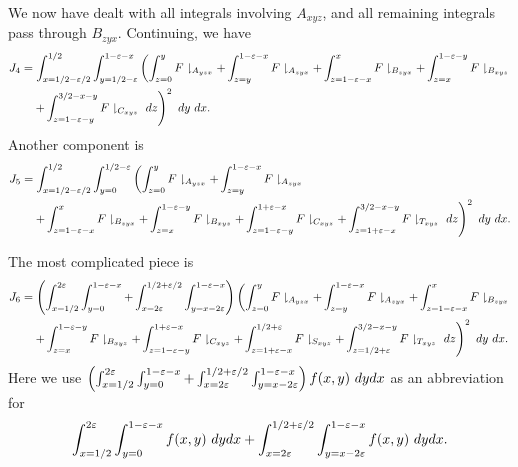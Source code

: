 We now have dealt with all integrals involving $A_{xyz}$, and all remaining integrals pass through $B_{zyx}$.  Continuing, we have
\begin{align*}
J_4 & =\int_{x=1/2-\varepsilon/2}^{1/2}\int_{y=1/2-\varepsilon}^{1-\varepsilon-x} \left(\int_{z=0}^{y}F\downharpoonright_{A_{yzx}}+\int_{z=y}^{1-\varepsilon-x}F\downharpoonright_{A_{zyx}} +\int_{z=1-\varepsilon-x}^{x}F\downharpoonright_{B_{zyx}} +\int_{z=x}^{1-\varepsilon-y}F\downharpoonright_{B_{xyz}}\right. \\
&\quad \left. +\int_{z=1-\varepsilon-y}^{3/2-x-y}F\downharpoonright_{C_{xyz}}\ dz \right)^{2}\ dy\ dx.
\end{align*}
Another component is
\begin{align*}
J_5 & = \int_{x=1/2-\eps/2}^{1/2}\int_{y=0}^{1/2-\eps} \left(\int_{z=0}^{y}F\downharpoonright_{A_{yzx}}+\int_{z=y}^{1-\eps-x}F\downharpoonright_{A_{zyx}} \right. \\
&\quad \left. +\int_{z=1-\eps-x}^{x}F\downharpoonright_{B_{zyx}} +\int_{z=x}^{1-\eps-y}F\downharpoonright_{B_{xyz}} +\int_{z=1-\eps-y}^{1+\eps-x}F\downharpoonright_{C_{xyz}} + \int_{z=1+\eps-x}^{3/2-x-y}F\downharpoonright_{T_{xyz}}\ dz \right)^{2}\ dy\ dx.
\end{align*}

The most complicated piece is
\begin{align*}
J_6 & =\left(\int_{x=1/2}^{2\eps} \int_{y=0}^{1-\eps-x} + \int_{x=2\eps}^{1/2+\eps/2}\int_{y=x-2\eps}^{1-\eps-x} \right) \left(\int_{z=0}^{y}F\downharpoonright_{A_{yzx}}+\int_{z=y}^{1-\eps-x}F\downharpoonright_{A_{zyx}} +\int_{z=1-\eps-x}^{x}F\downharpoonright_{B_{zyx}}  \right. \\
&\quad \left. +\int_{z=x}^{1-\eps-y}F\downharpoonright_{B_{xyz}} +\int_{z=1-\eps-y}^{1+\eps-x}F\downharpoonright_{C_{xyz}} + \int_{z=1+\eps-x}^{1/2+\eps}F\downharpoonright_{S_{xyz}}+ \int_{z=1/2+\eps}^{3/2-x-y}F\downharpoonright_{T_{xyz}}\ dz \right)^{2}\ dy\ dx.
\end{align*}
Here we use $\left(\int_{x=1/2}^{2\eps} \int_{y=0}^{1-\eps-x} + \int_{x=2\eps}^{1/2+\eps/2}\int_{y=x-2\eps}^{1-\eps-x} \right) f(x,y)\ dy dx$ as an abbreviation for
$$ \int_{x=1/2}^{2\varepsilon} \int_{y=0}^{1-\varepsilon-x} f(x,y)\ dy dx + \int_{x=2\varepsilon}^{1/2+\varepsilon/2}\int_{y=x-2\varepsilon}^{1-\varepsilon-x} f(x,y)\ dy dx.$$

